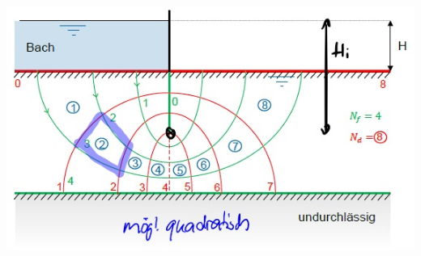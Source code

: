 \begin{minipage}{0.4\linewidth}
	\includegraphics[width=\linewidth]{images/GW17Sickernetz.jpg}
\end{minipage}





